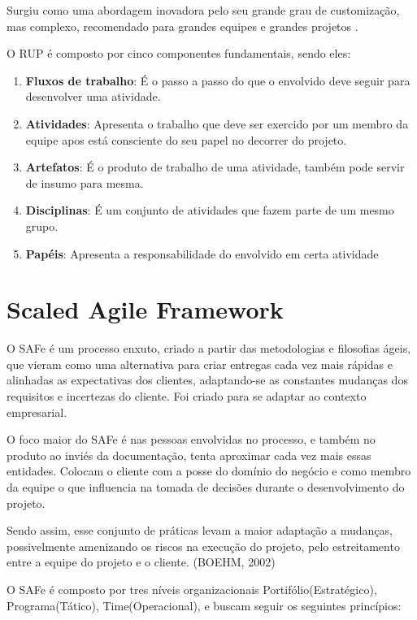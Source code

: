 Surgiu como uma abordagem inovadora pelo seu grande grau de customização, mas complexo,
recomendado para grandes equipes e grandes projetos \cite{KRUCHTEN}.

O RUP é composto por cinco componentes fundamentais, sendo eles:

\begin{enumerate}
  \item \textbf{Fluxos de trabalho}: É o passo a passo do que o envolvido deve seguir para
  desenvolver uma atividade.
  \item \textbf{Atividades}: Apresenta o trabalho que deve ser exercido por um membro da equipe
  apos está consciente do seu papel no decorrer do projeto.
  \item \textbf{Artefatos}: É o produto de trabalho de uma atividade, também pode servir de insumo para mesma.
  \item \textbf{Disciplinas}: É um conjunto de atividades que fazem parte de um mesmo grupo.
  \item \textbf{Papéis}: Apresenta a responsabilidade do envolvido em certa atividade
\end{enumerate}

\section{Scaled Agile Framework}

O SAFe é um processo enxuto, criado a partir das metodologias e filosofias ágeis,
que vieram como uma alternativa para criar entregas cada vez mais rápidas e alinhadas
as expectativas dos clientes, adaptando-se as constantes mudanças dos requisitos
e incertezas do cliente. Foi criado para se adaptar ao contexto empresarial.

O foco maior do SAFe é nas pessoas envolvidas no processo, e também no produto ao
inviés da documentação, tenta aproximar cada vez mais essas entidades. Colocam o
cliente com a posse do domínio do negócio e como membro da equipe o que influencia
na tomada de decisões durante o desenvolvimento do projeto.

Sendo assim, esse conjunto de práticas levam a maior adaptação a mudanças, possivelmente
amenizando os riscos na execução do projeto, pelo estreitamento entre a equipe do projeto
e o cliente. (BOEHM, 2002)

O SAFe é composto por tres níveis organizacionais Portifólio(Estratégico),
Programa(Tático), Time(Operacional), e buscam seguir os seguintes princípios:


